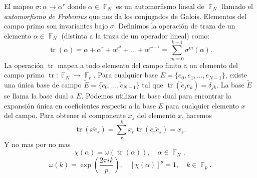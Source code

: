 \documentclass[a4paper]{report}
\DeclareMathOperator{\F}{\mathbb{F}}
\DeclareMathOperator{\tr}{tr}
\begin{document}
  El mapeo $\sigma : \alpha \to \alpha^r$ donde $\alpha \in
  \F_N$ es un automorfismo lineal de $\F_N$ llamado el
  \textit{automorfismo de Frobenius} que nos da los
  conjugados de Galois. Elementos del campo primo son
  invariantes bajo $\sigma$. Definimos la operación de traza
  de un elemento $\alpha \in \F_N$ (distinta a la traza de
  un operador lineal) como:
  \[
    \tr(\alpha) 
    = \alpha + \alpha^{r} + \alpha^{r^2} + \ldots +
    \alpha^{r^{k-1}}
    = \sum_{m=0}^{k-1} \sigma^{m}(\alpha).
  \] 
  La operación $\tr$ mapea a todo elemento del campo finito
  a un elemento del campo primo $\tr : \F_N \to \F_r$. Para
  cualquier base $E = \{e_0,e_1,\ldots,e_{N-1}\}$, existe
  una única base de campo $\tilde E = \{\tilde
  e_0,\ldots,\tilde e_{N-1}\}$ tal que $\tr(\tilde e_j e_k)
  = \delta_{jk}$. La base $\tilde E$ se llama la base dual a
  $E$. Podemos utilizar la base dual para encontrar la
  expansión única en coeficientes respecto a la base $E$ 
  para cualquier elemento $x$ del campo. Para obtener el
  componente $x_s$ del elemento $x$, hacemos
  \[
    \tr(x \tilde e_s)
    = \sum_{r}^{k} x_r \tr(e_r \tilde e_s)
    = x_s.
  \] 
  Y no mas por no mas
  \[
    \chi(\alpha)
    = \omega\left( \tr(\alpha) \right),
    \quad \alpha \in \F_N,
  \] 
  \[
    \omega(k)
    = \exp\left( \frac{2\pi i k}{p} \right),
    \quad [\chi(\alpha)]^{p} = 1, 
    \quad k \in \F_p.
  \] 
\end{document}

